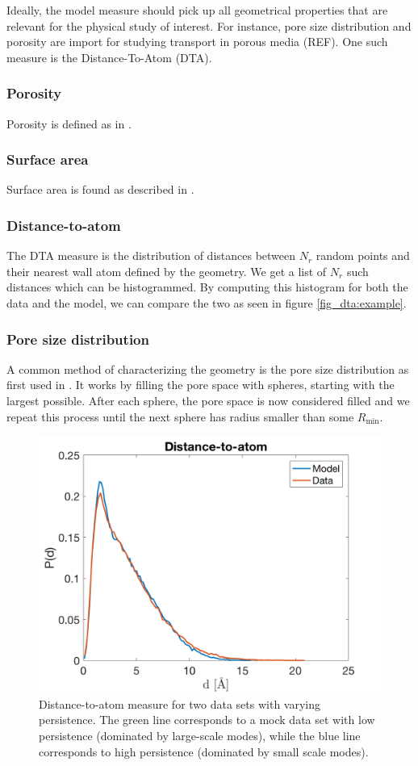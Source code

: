 \documentclass[aps,pre,twocolumn,letterpaper,floatfix,showpacs]{revtex4}
\begin{document}
Ideally, the model measure should pick up all geometrical properties that are relevant for the physical study of interest. For instance, pore size distribution and porosity are import for studying transport in porous media (REF). One such measure is the Distance-To-Atom (DTA).

\subsubsection{Porosity}
Porosity is defined as in \cite{gelb1998characterization}.

\subsubsection{Surface area}
Surface area is found as described in \cite{gelb1998characterization}.

\subsubsection{Distance-to-atom}
The DTA measure is the distribution of distances between $N_r$ random points and their nearest wall atom defined by the geometry. We get a list of $N_r$ such distances which can be histogrammed. By computing this histogram for both the data and the model, we can compare the two as seen in figure \ref{fig_dta:example}. 

\subsubsection{Pore size distribution}
A common method of characterizing the geometry is the pore size distribution as first used in \cite{gelb1999pore}. It works by filling the pore space with spheres, starting with the largest possible. After each sphere, the pore space is now considered filled and we repeat this process until the next sphere has radius smaller than some $R_\text{min}$. 

\begin{figure}[htb!]
\includegraphics[width=.45\textwidth]{DTA.png}
\caption{Distance-to-atom measure for two data sets with varying persistence. The green line corresponds to a mock data set with low persistence (dominated by large-scale modes), while the blue line corresponds to high persistence (dominated by small scale modes). }
\label{fig:dta_example}
\end{figure}
\end{document}
